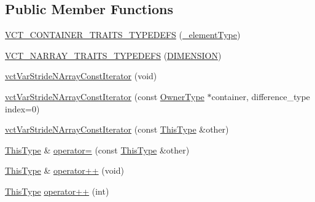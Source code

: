 \subsection*{Public Member Functions}
\begin{DoxyCompactItemize}
\item 
\hyperlink{classvct_var_stride_n_array_const_iterator_ae89910338c34d9b0cdc72fcc4ae12092}{V\+C\+T\+\_\+\+C\+O\+N\+T\+A\+I\+N\+E\+R\+\_\+\+T\+R\+A\+I\+T\+S\+\_\+\+T\+Y\+P\+E\+D\+E\+F\+S} (\hyperlink{classvct_var_stride_n_array_const_iterator_adb02654cc147e6ce3ceef03ebe78c4e2}{\+\_\+element\+Type})
\item 
\hyperlink{classvct_var_stride_n_array_const_iterator_a1d1db55ab0498294bba256e282a0ea8d}{V\+C\+T\+\_\+\+N\+A\+R\+R\+A\+Y\+\_\+\+T\+R\+A\+I\+T\+S\+\_\+\+T\+Y\+P\+E\+D\+E\+F\+S} (\hyperlink{classvct_var_stride_n_array_const_iterator_af8a3a7bff8c62645957f37e5f0a2cb26a66232514960f77bde765de7883b9c9ad}{D\+I\+M\+E\+N\+S\+I\+O\+N})
\item 
\hyperlink{classvct_var_stride_n_array_const_iterator_a802806a33cb622fd4bdd438175d95c90}{vct\+Var\+Stride\+N\+Array\+Const\+Iterator} (void)
\item 
\hyperlink{classvct_var_stride_n_array_const_iterator_ad0c5f8b7c4e1e88d9af26d5605c60376}{vct\+Var\+Stride\+N\+Array\+Const\+Iterator} (const \hyperlink{classvct_var_stride_n_array_const_iterator_ac75d53a8defeee467ba9ebe2962e29ac}{Owner\+Type} $\ast$container, difference\+\_\+type index=0)
\item 
\hyperlink{classvct_var_stride_n_array_const_iterator_a905d6e8a90b5c0bff01fc145b77a859b}{vct\+Var\+Stride\+N\+Array\+Const\+Iterator} (const \hyperlink{classvct_var_stride_n_array_const_iterator_ac729d2af265785aad6fdd43a70fbffdb}{This\+Type} \&other)
\item 
\hyperlink{classvct_var_stride_n_array_const_iterator_ac729d2af265785aad6fdd43a70fbffdb}{This\+Type} \& \hyperlink{classvct_var_stride_n_array_const_iterator_a15bacda9f4ba8d656728839c40c7d72c}{operator=} (const \hyperlink{classvct_var_stride_n_array_const_iterator_ac729d2af265785aad6fdd43a70fbffdb}{This\+Type} \&other)
\item 
\hyperlink{classvct_var_stride_n_array_const_iterator_ac729d2af265785aad6fdd43a70fbffdb}{This\+Type} \& \hyperlink{classvct_var_stride_n_array_const_iterator_af24b676b194e0cdd305b0e8f2469d8d8}{operator++} (void)
\item 
\hyperlink{classvct_var_stride_n_array_const_iterator_ac729d2af265785aad6fdd43a70fbffdb}{This\+Type} \hyperlink{classvct_var_stride_n_array_const_iterator_ad5f024132eccdaacd115fcff10e6d222}{operator++} (int)

\end{DoxyCompactItemize}
